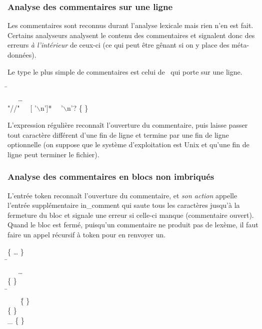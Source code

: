 %
\begin{frame}
\frametitle{Analyse des commentaires sur une ligne}

\vspace*{-1pt}

Les commentaires sont reconnus durant l'analyse lexicale mais rien
n'en est fait. Certains analyseurs analysent le contenu des
commentaires et signalent donc des erreurs \emph{à l'intérieur} de
ceux-ci (ce qui peut être gênant si on y place des méta-données).

Le type le plus simple de commentaires est celui de~\cpp{} qui porte
sur une ligne.
{\small
\begin{tabbing}
\Xrule \=  \equal \Xparse\\
\> \ \ \ \ldots\\
\> \vbar{} \textsf{"//"\ \ \ [ '\(\backslash\)n']*
  \ \ '\(\backslash\)n'?} \{   \}
\end{tabbing}
}
L'expression régulière reconnaît l'ouverture du commentaire, puis
laisse passer tout caractère différent d'une fin de ligne et termine
par une fin de ligne optionnelle (on suppose que le système
d'exploitation est Unix et qu'une fin de ligne peut terminer le
fichier).
\end{frame}

%
\begin{frame}
\frametitle{Analyse des commentaires en blocs non imbriqués}

L'entrée \textsf{token} reconnaît l'ouverture du
commentaire, et \emph{son action} appelle l'entrée supplémentaire
\textsf{in\_comment} qui saute tous les caractères jusqu'à la
fermeture du bloc et signale une erreur si celle-ci manque
(commentaire ouvert). Quand le bloc est fermé, puisqu'un commentaire
ne produit pas de lexème, il faut faire un appel récursif à
\textsf{token} pour en renvoyer un.
{\small
\begin{tabbing}
\{ \ldots{} \Xexception {} \}\\
\Xrule \=  \equal \Xparse\\
\> \ \ \ \ldots\\
\> \vbar{} \str{/*} \{   \}\\
\Xand \=  \equal \Xparse\\
\> \ \ \ \str{*/} \= \{   \}\\
\> \vbar{}  \> \{   \}\\
\> \vbar{} {\LARGE \_} \> \{   \}
\end{tabbing}
}
\end{frame}

